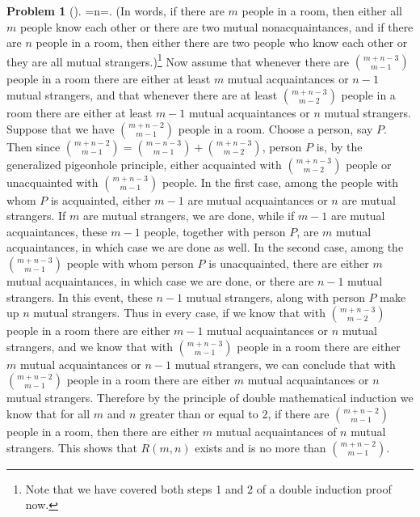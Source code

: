 \documentclass[10pt,]{book}
\theoremstyle{plain}
\theoremstyle{definition}
\newtheorem{activity}[project]{Problem}
\theoremstyle{definition}
\numberwithin{equation}{chapter}
\begin{document}
\begin{activity}[]
=n=\). (In words, if there are \(m\) people in a room, then either all \(m\) people know each other or there are two mutual nonacquaintances, and if there are \(n\) people in a room, then either there are two people who know each other or they are all mutual strangers.)\footnote{Note that we have covered both steps 1 and 2 of a double induction proof now.\label{fn-5}} Now assume that whenever there are \(\binom{m+n-3}{m-1}\) people in a room there are either at least \(m\) mutual acquaintances or \(n-1\) mutual strangers, and that whenever there are at least \(\binom{m+n-3}{m-2}\) people in a room there are either at least \(m-1\) mutual acquaintances or \(n\) mutual strangers. Suppose that we have \(\binom{m+n-2}{m-1}\) people in a room. Choose a person, say \(P\). Then since \(\binom{m+n-2}{m-1} = \binom{m-n-3}{m-1} +\binom{m+n-3}{m-2}\), person \(P\) is, by the generalized pigeonhole principle, either acquainted with \(\binom{m+n-3}{m-2}\) people or unacquainted with \(\binom{m+n-3}{m-1}\) people. In the first case, among the people with whom \(P\) is acquainted, either \(m-1\) are mutual acquaintances or \(n\) are mutual strangers. If \(m\) are mutual strangers, we are done, while if \(m-1\) are mutual acquaintances, these \(m-1\) people, together with person \(P\), are \(m\) mutual acquaintances, in which case we are done as well. In the second case, among the \(\binom{m+n-3}{m-1}\) people with whom person \(P\) is unacquainted, there are either \(m\) mutual acquaintances, in which case we are done, or there are \(n-1\) mutual strangers. In this event, these \(n-1\) mutual strangers, along with person \(P\) make up \(n\) mutual strangers. Thus in every case, if we know that with \(\binom{m+n-3}{m-2}\) people in a room there are either \(m-1\) mutual acquaintances or \(n\) mutual strangers, and we know that with \(\binom{m+n-3}{m-1}\) people in a room there are either \(m\) mutual acquaintances or \(n-1\) mutual strangers, we can conclude that with \(\binom{m+n-2}{m-1}\) people in a room there are either \(m\) mutual acquaintances or \(n\) mutual strangers. Therefore by the principle of double mathematical induction we know that for all \(m\) and \(n\) greater than or equal to 2, if there are \(\binom{m+n-2}{m-1}\) people in a room, then there are either \(m\) mutual acquaintances of \(n\) mutual strangers. This shows that \(R(m,n)\) exists and is no more than \(\binom{m+n-2}{m-1}\).%
\end{activity}
\end{document}
